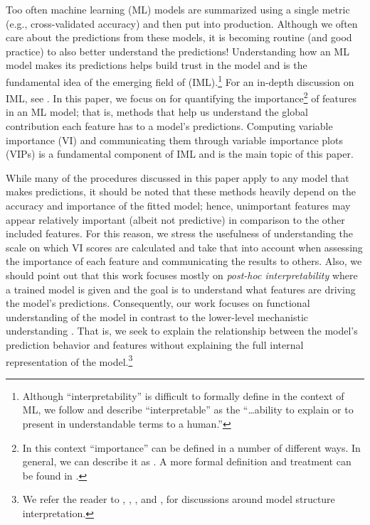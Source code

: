 Too often machine learning (ML) models are summarized using a single
metric (e.g., cross-validated accuracy) and then put into production.
Although we often care about the predictions from these models, it is
becoming routine (and good practice) to also better understand the
predictions! Understanding how an ML model makes its predictions helps
build trust in the model and is the fundamental idea of the emerging
field of  (IML).\footnote{Although
  ``interpretability'' is difficult to formally define in the context of
  ML, we follow \citet{doshivelez-2017-rigorous} and describe
  ``interpretable'' as the ``\ldots{}ability to explain or to present in
  understandable terms to a human.''} For an in-depth discussion on IML,
see \citet{molnar-2019-iml}. In this paper, we focus on
 for quantifying the importance\footnote{In this
  context ``importance'' can be defined in a number of different ways.
  In general, we can describe it as
  .
  A more formal definition and treatment can be found in
  \citet{laan-2006-statistical}.} of features in an ML model; that is,
methods that help us understand the global contribution each feature has
to a model's predictions. Computing variable importance (VI) and
communicating them through variable importance plots (VIPs) is a
fundamental component of IML and is the main topic of this paper.

While many of the procedures discussed in this paper apply to any model
that makes predictions, it should be noted that these methods heavily
depend on the accuracy and importance of the fitted model; hence,
unimportant features may appear relatively important (albeit not
predictive) in comparison to the other included features. For this
reason, we stress the usefulness of understanding the scale on which VI
scores are calculated and take that into account when assessing the
importance of each feature and communicating the results to others.
Also, we should point out that this work focuses mostly on
\emph{post-hoc interpretability} where a trained model is given and the
goal is to understand what features are driving the model's predictions.
Consequently, our work focuses on functional understanding of the model
in contrast to the lower-level mechanistic understanding
\citep{montavon-2018-methods}. That is, we seek to explain the
relationship between the model's prediction behavior and features
without explaining the full internal representation of the
model.\footnote{We refer the reader to \citet{poulin-2006-visual},
  \citet{caruana-2015-intelligible},
  \citet{bibal-2016-intterpretability}, and \citet{bau-2017-network},
  for discussions around model structure interpretation.}

